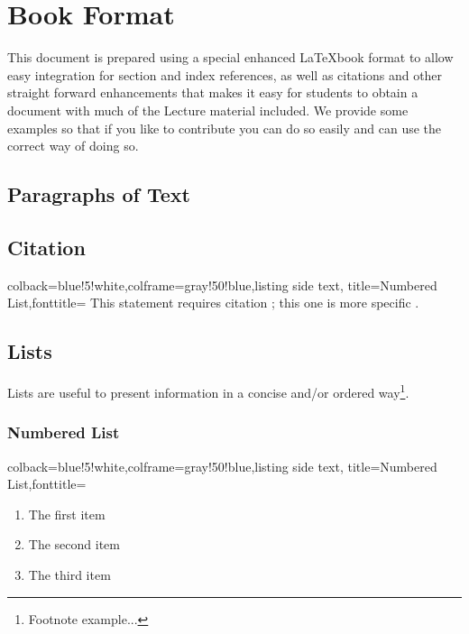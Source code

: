 

\chapter{Book Format}

\FILENAME

This document is prepared using a special enhanced \LaTeX book format to allow
easy integration for section and index references, as well as
citations and other straight forward enhancements that makes it easy
for students to obtain a document with much of the Lecture material
included. We provide some examples so that if you like to contribute
you can do so easily and can use the correct way of doing so.


\section{Paragraphs of Text}

\lipsum[1] %


\section{Citation}

\begin{tcblisting}{colback=blue!5!white,colframe=gray!50!blue,listing side text,
  title=Numbered List,fonttitle=\bfseries}
This statement requires citation \cite{article_key}; 
this one is more specific \cite[162]{book_key}.
\end{tcblisting}


\section{Lists}

Lists are useful to present information in a concise and/or ordered way\footnote{Footnote example...}.

\subsection{Numbered List}

\begin{tcblisting}{colback=blue!5!white,colframe=gray!50!blue,listing side text,
  title=Numbered List,fonttitle=\bfseries}
\begin{enumerate}
\item The first item
\item The second item
\item The third item
\end{enumerate}
\end{tcblisting}

